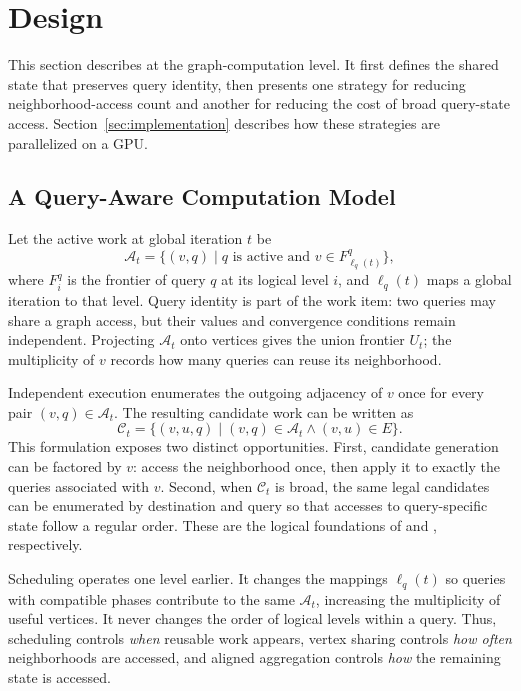 \section{Design}
\label{sec:design}

This section describes \system at the graph-computation level.  It first defines the shared state that preserves query identity, then presents one strategy for reducing neighborhood-access count and another for reducing the cost of broad query-state access.  Section~\ref{sec:implementation} describes how these strategies are parallelized on a GPU.

\subsection{A Query-Aware Computation Model}

Let the active work at global iteration $t$ be
\begin{equation}
  \mathcal{A}_t=\{(v,q)\mid q\text{ is active and }v\in F_{\ell_q(t)}^q\},
  \label{eq:active-work}
\end{equation}
where $F_i^q$ is the frontier of query $q$ at its logical level $i$, and $\ell_q(t)$ maps a global iteration to that level.  Query identity is part of the work item: two queries may share a graph access, but their values and convergence conditions remain independent.  Projecting $\mathcal{A}_t$ onto vertices gives the union frontier $U_t$; the multiplicity of $v$ records how many queries can reuse its neighborhood.

Independent execution enumerates the outgoing adjacency of $v$ once for every pair $(v,q)\in\mathcal{A}_t$.  The resulting candidate work can be written as
\begin{equation}
  \mathcal{C}_t=\{(v,u,q)\mid(v,q)\in\mathcal{A}_t\land (v,u)\in E\}.
  \label{eq:candidate-work}
\end{equation}
This formulation exposes two distinct opportunities.  First, candidate generation can be factored by $v$: access the neighborhood once, then apply it to exactly the queries associated with $v$.  Second, when $\mathcal{C}_t$ is broad, the same legal candidates can be enumerated by destination and query so that accesses to query-specific state follow a regular order.  These are the logical foundations of \sharedexpand and \coalescedgather, respectively.

Scheduling operates one level earlier.  It changes the mappings $\ell_q(t)$ so queries with compatible phases contribute to the same $\mathcal{A}_t$, increasing the multiplicity of useful vertices.  It never changes the order of logical levels within a query.  Thus, scheduling controls \emph{when} reusable work appears, vertex sharing controls \emph{how often} neighborhoods are accessed, and aligned aggregation controls \emph{how} the remaining state is accessed.

